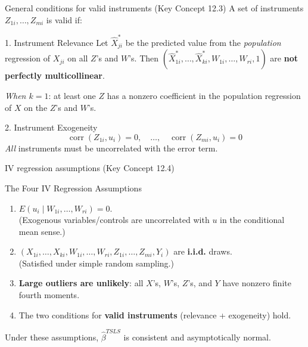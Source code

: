 \documentclass[10pt]{beamer}
\begin{document}
\begin{frame}{General conditions for valid instruments (Key Concept 12.3)}
\label{slide:general_validity}
A set of instruments $Z_{1i}, \ldots, Z_{mi}$ is valid if:

\begin{block}{1. Instrument Relevance}
Let $\widehat{X}_{ji}^*$ be the predicted value from the \emph{population} regression of $X_{ji}$ on all $Z$'s and $W$'s. Then $(\widehat{X}_{1i}^*, \ldots, \widehat{X}_{ki}^*, W_{1i}, \ldots, W_{ri}, 1)$ are \textbf{not perfectly multicollinear}.

\vspace{0.3em}
\emph{When $k=1$}: at least one $Z$ has a nonzero coefficient in the population regression of $X$ on the $Z$'s and $W$'s.
\end{block}

\begin{block}{2. Instrument Exogeneity}
\[
\operatorname{corr}(Z_{1i}, u_i) = 0, \quad \ldots, \quad \operatorname{corr}(Z_{mi}, u_i) = 0
\]
\emph{All} instruments must be uncorrelated with the error term.
\end{block}
\end{frame}

\begin{frame}{IV regression assumptions (Key Concept 12.4)}
\label{slide:iv_assumptions}
\begin{block}{The Four IV Regression Assumptions}
\begin{enumerate}
  \item $E(u_i \mid W_{1i}, \ldots, W_{ri}) = 0$.\\
  {\small (Exogenous variables/controls are uncorrelated with $u$ in the conditional mean sense.)}

  \item $(X_{1i}, \ldots, X_{ki}, W_{1i}, \ldots, W_{ri}, Z_{1i}, \ldots, Z_{mi}, Y_i)$ are \textbf{i.i.d.} draws.\\
  {\small (Satisfied under simple random sampling.)}

  \item \textbf{Large outliers are unlikely}: all $X$'s, $W$'s, $Z$'s, and $Y$ have nonzero finite fourth moments.

  \item The two conditions for \textbf{valid instruments} (relevance + exogeneity) hold.
\end{enumerate}
\end{block}

\pause
Under these assumptions, $\widehat{\beta}^{TSLS}$ is \alert{consistent} and \alert{asymptotically normal}.
\end{frame}
\end{document}
